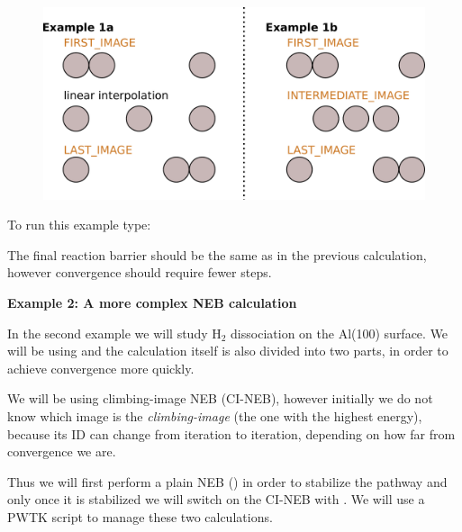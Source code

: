 \documentclass[landscape]{foils}
\begin{document}
\begin{figure}
  \centering
    \includegraphics[width=22cm]{figs/neb-w-intermimage.pdf}
\end{figure}

To run this example type:

{\small {}}

The final reaction barrier should be the same as in the previous
calculation, however convergence should require fewer steps.

{\bf Example 2: A more complex NEB calculation}

In the second example we will study $\mathrm{H_2} $ dissociation on
the Al(100) surface. We will be using  and
the calculation itself is also divided into two parts, in order to
achieve convergence more quickly.

We will be using climbing-image NEB (CI-NEB), however initially we do
not know which image is the {\em climbing-image} (the one with the
highest energy), because its ID can change from iteration to
iteration, depending on how far from convergence we are.

Thus we will first perform a plain NEB () in
order to stabilize the pathway and only once it is stabilized we will
switch on the CI-NEB with . We will use a
PWTK script to manage these two calculations.
\end{document}

